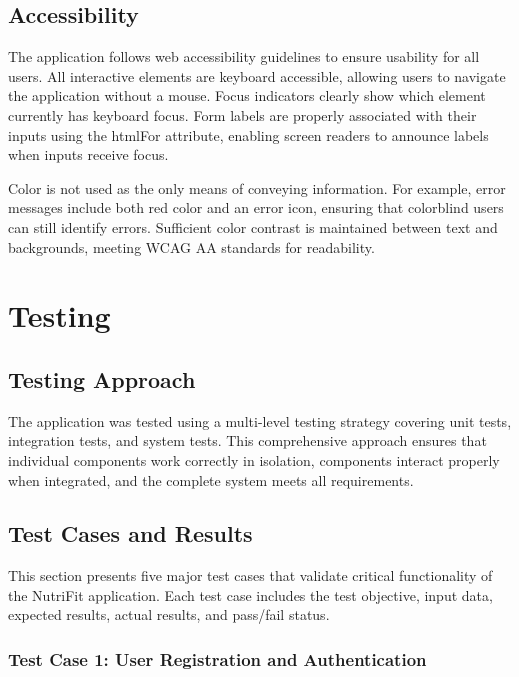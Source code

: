 \subsection{Accessibility}

The application follows web accessibility guidelines to ensure usability for all users. All interactive elements are keyboard accessible, allowing users to navigate the application without a mouse. Focus indicators clearly show which element currently has keyboard focus. Form labels are properly associated with their inputs using the htmlFor attribute, enabling screen readers to announce labels when inputs receive focus.

Color is not used as the only means of conveying information. For example, error messages include both red color and an error icon, ensuring that colorblind users can still identify errors. Sufficient color contrast is maintained between text and backgrounds, meeting WCAG AA standards for readability.

\section{Testing}

\subsection{Testing Approach}

The application was tested using a multi-level testing strategy covering unit tests, integration tests, and system tests. This comprehensive approach ensures that individual components work correctly in isolation, components interact properly when integrated, and the complete system meets all requirements.

\subsection{Test Cases and Results}

This section presents five major test cases that validate critical functionality of the NutriFit application. Each test case includes the test objective, input data, expected results, actual results, and pass/fail status.

\subsubsection{Test Case 1: User Registration and Authentication}

